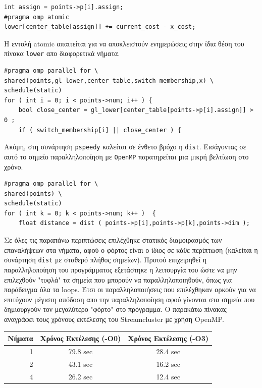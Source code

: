 \documentclass[a4paper,11pt]{article}
\begin{document}
\begin{lstlisting}
int assign = points->p[i].assign;
#pragma omp atomic
lower[center_table[assign]] += current_cost - x_cost;
\end{lstlisting}
Η εντολή atomic απαιτείται για να αποκλειστούν ενημερώσεις στην ίδια θέση του πίνακα \texttt{lower} απο διαφορετικά νήματα.

\begin{lstlisting}
#pragma omp parallel for \
shared(points,gl_lower,center_table,switch_membership,x) \
schedule(static)
for ( int i = 0; i < points->num; i++ ) {
    bool close_center = gl_lower[center_table[points->p[i].assign]] > 0 ;
    if ( switch_membership[i] || close_center ) {
\end{lstlisting}

Ακόμη, στη συνάρτηση \texttt{pspeedy} καλείται σε ένθετο βρόχο η \texttt{dist}. Εισάγοντας σε αυτό το σημείο παραλληλοποίηση με \texttt{OpenMP} παρατηρείται μια μικρή βελτίωση στο χρόνο.

\begin{lstlisting}
#pragma omp parallel for \
shared(points) \
schedule(static)
for ( int k = 0; k < points->num; k++ )  {
    float distance = dist ( points->p[i],points->p[k],points->dim );
\end{lstlisting}

Σε όλες τις παραπάνω περιπτώσεις επιλέχθηκε στατικός διαμοιρασμός των επαναλήψεων στα νήματα, αφού ο φόρτος είναι ο ίδιος σε κάθε περίπτωση (καλείται η συνάρτηση \texttt{dist} με σταθερό πλήθος σημείων).
Προτού επιχειρηθεί η παραλληλοποίηση του προγράμματος εξετάστηκε η λειτουργία του ώστε να μην επιλεχθούν "τυφλά" τα σημεία που μπορούν να παραλληλοποιηθούν, όπως για παράδειγμα όλα τα loops.
Έτσι οι παραλληλοποιήσεις που επιλέχθηκαν αρκούν για να επιτύχουν μέγιστη απόδοση απο την παραλληλοποίηση αφού γίνονται στα σημεία που δημιουργούν τον μεγαλύτερο "φόρτο" στο πρόγραμμα.
Ο παρακάτω πίνακας αναγράφει τους χρόνους εκτέλεσης του Streamcluster με χρήση OpenMP.

\begin{center}
\begin{tabular}{|r|c|c|}
    \hline
    Νήματα & Χρόνος Εκτέλεσης (-Ο0) & Χρόνος Εκτέλεσης (-Ο3) \\ \hline
    1 & 79.8 sec & 28.4 sec \\
    2 & 43.1 sec & 16.2 sec \\
    4 & 26.2 sec & 12.4 sec \\ \hline
\end{tabular}
\end{center}
\end{document}
